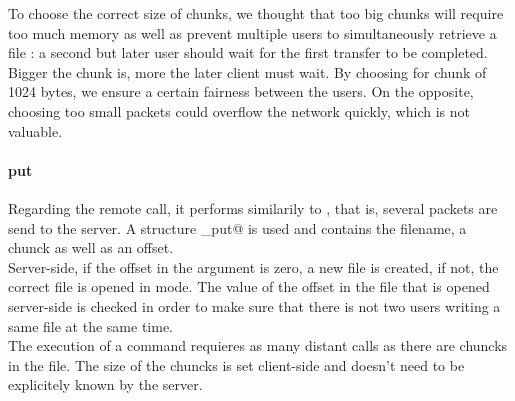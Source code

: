 \documentclass{article}
\begin{document}
To choose the correct size of chunks, we thought that too big chunks will require too much memory as well as prevent multiple users to simultaneously retrieve a file : a second but later user should wait for the first transfer to be completed. Bigger the chunk is, more the later client must wait. By choosing for chunk of 1024 bytes, we ensure a certain fairness between the users. On the opposite, choosing too small packets could overflow the network quickly, which is not valuable.

\paragraph{put} Regarding the \verb@put@ remote call, it performs similarily to \verb@get@, that is, several packets are send to the server. A structure \verb@file_put@ is used and contains the filename, a chunck as well as an offset.\\

Server-side, if the offset in the argument is zero, a new file is created, if not, the correct file is opened in \verb@append@ mode. The value of the offset in the file that is opened server-side is checked in order to make sure that there is not two users writing a same file at the same time.\\

The execution of a \verb@put@ command requieres as many distant calls as there are chuncks in the file. The size of the chuncks is set client-side and doesn't need to be explicitely known by the server.
 
\end{document}
